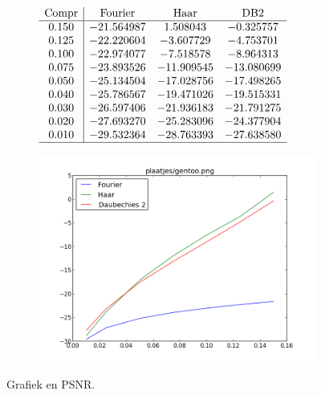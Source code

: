 \documentclass[11pt]{report}
\theoremstyle{plain}
\theoremstyle{remark}
\begin{document}
\begin{figure}
	\centering
	\begin{subfigure}[t]{0.48\textwidth}
	\centering
	\vspace{10pt}
	\begingroup
	
\renewcommand*{\arraystretch}{1.5}
	$\begin{array}{c | c c c c}
	\text{Compr} & \text{Fourier} & \text{Haar} & \text{DB2} \\ \hline
	0.150 & -21.564987 & 1.508043 & -0.325757 \\
	0.125 & -22.220604 & -3.607729 & -4.753701 \\
	0.100 & -22.974077 & -7.518578 & -8.964313 \\
	0.075 & -23.893526 & -11.909545 & -13.080699 \\
	0.050 & -25.134504 & -17.028756 & -17.498265 \\
	0.040 & -25.786567 & -19.471026 & -19.515331 \\
	0.030 & -26.597406 & -21.936183 & -21.791275 \\
	0.020 & -27.693270 & -25.283096 & -24.377904 \\
	0.010 & -29.532364 & -28.763393 & -27.638580 \\ \hline
	\end{array}$
	\endgroup
	\end{subfigure}	
	\begin{subfigure}[t]{0.48\textwidth}
		\centering
		\vspace{0pt}
		\includegraphics[height=\textwidth]{plaatjes/grafiek_gentoo_0_15-0_01.png}
	\end{subfigure}
	\caption{Grafiek en PSNR.}
\end{figure}
\restoregeometry
\pagebreak
\end{document}
